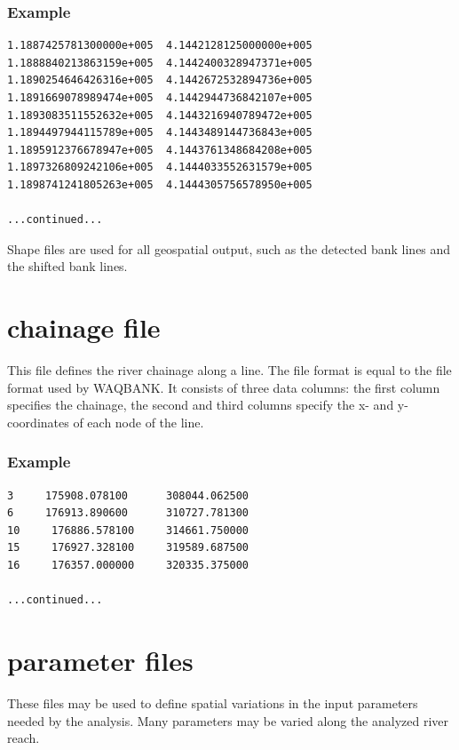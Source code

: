 \subsubsection*{Example}

\begin{Verbatim}
1.1887425781300000e+005  4.1442128125000000e+005
1.1888840213863159e+005  4.1442400328947371e+005
1.1890254646426316e+005  4.1442672532894736e+005
1.1891669078989474e+005  4.1442944736842107e+005
1.1893083511552632e+005  4.1443216940789472e+005
1.1894497944115789e+005  4.1443489144736843e+005
1.1895912376678947e+005  4.1443761348684208e+005
1.1897326809242106e+005  4.1444033552631579e+005
1.1898741241805263e+005  4.1444305756578950e+005

...continued...
\end{Verbatim}

Shape files are used for all geospatial output, such as the detected bank lines and the shifted bank lines.

\section{chainage file}

This file defines the river chainage along a line.
The file format is equal to the file format used by WAQBANK.
It consists of three data columns: the first column specifies the chainage, the second and third columns specify the x- and y-coordinates of each node of the line.

\subsubsection*{Example}

\begin{Verbatim}
3     175908.078100      308044.062500
6     176913.890600      310727.781300
10     176886.578100     314661.750000
15     176927.328100     319589.687500
16     176357.000000     320335.375000 

...continued...
\end{Verbatim}

\section{parameter files} \label{Sec:parfile}

These files may be used to define spatial variations in the input parameters needed by the analysis.
Many parameters may be varied along the analyzed river reach.

